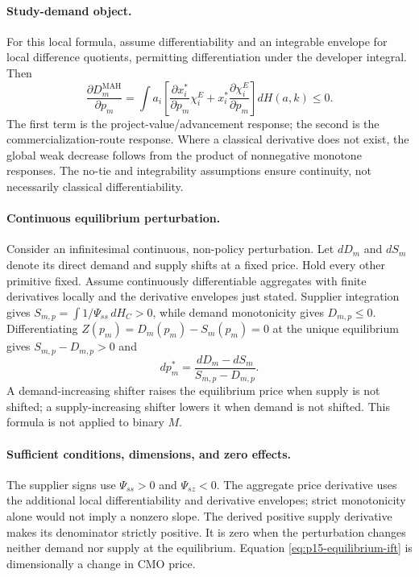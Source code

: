 \paragraph{Study-demand object.}
For this local formula, assume differentiability and an integrable envelope
for local difference quotients, permitting differentiation under the
developer integral. Then
\begin{equation}
  \frac{\partial D_m^{\mathrm{MAH}}}{\partial p_m}
  =
  \int a_i
  \left[
    \frac{\partial x_i^*}{\partial p_m}\chi_i^E
    +
    x_i^*\frac{\partial\chi_i^E}{\partial p_m}
  \right]dH(a,k)
  \leq0.
  \label{eq:p15-study-demand-slope}
\end{equation}
The first term is the project-value/advancement response; the second is the
commercialization-route response. Where a classical derivative does not
exist, the global weak decrease follows from the product of nonnegative monotone
responses. The no-tie and integrability assumptions ensure continuity,
not necessarily classical differentiability.

\paragraph{Continuous equilibrium perturbation.}
Consider an infinitesimal continuous, non-policy perturbation. Let
\(dD_m\) and \(dS_m\) denote its direct demand and supply shifts at a fixed
price. Hold every other primitive fixed. Assume continuously differentiable
aggregates with finite derivatives locally and the derivative envelopes just
stated. Supplier integration gives \(S_{m,p}=\int 1/\Psi_{ss}\,dH_C>0\),
while demand monotonicity gives \(D_{m,p}\leq0\). Differentiating
\(Z(p_m)=D_m(p_m)-S_m(p_m)=0\) at the unique equilibrium gives
\(S_{m,p}-D_{m,p}>0\) and
\begin{equation}
  dp_m^*
  =
  \frac{dD_m-dS_m}
       {S_{m,p}-D_{m,p}}.
  \label{eq:p15-equilibrium-ift}
\end{equation}
A demand-increasing shifter raises the equilibrium price when supply is not
shifted; a supply-increasing shifter lowers it when demand is not shifted.
This formula is not applied to binary \(M\).

\paragraph{Sufficient conditions, dimensions, and zero effects.}
The supplier signs use \(\Psi_{ss}>0\) and \(\Psi_{sz}<0\). The aggregate
price derivative uses the additional local differentiability and derivative
envelopes; strict monotonicity alone would not imply a nonzero slope. The
derived positive supply derivative makes its denominator strictly positive. It is zero when the perturbation changes
neither demand nor supply at the equilibrium. Equation
\eqref{eq:p15-equilibrium-ift} is dimensionally a change in CMO price.

